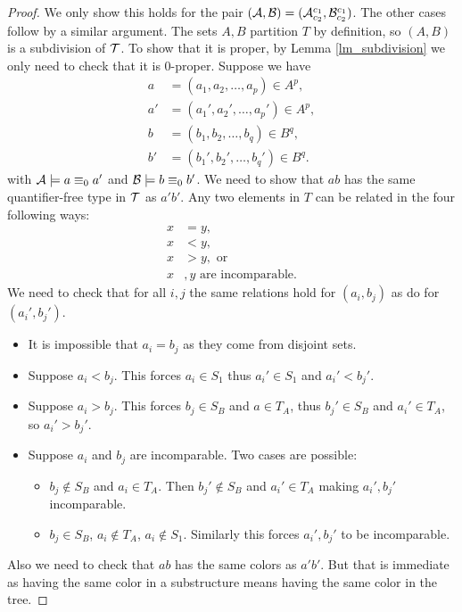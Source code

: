 \begin{proof}
  We only show this holds for the pair $(\mathcal A, \mathcal B) = (\mathcal A^{c_1}_{c_2} ,\mathcal B^{c_1}_{c_2})$.
  The other cases follow by a similar argument.
  The sets $A,B$ partition $T$ by definition, so $(A,B)$ is a subdivision of $\operatorname{\mathcal T}$.
  To show that it is proper, by Lemma \ref{lm_subdivision} we only need to check that it is $0$-proper. Suppose we have
  \begin{align*}
    a &= (a_1, a_2, \ldots, a_p) \in A^p, \\
    a' &= (a_1', a_2', \ldots, a_p') \in A^p,  \\
    b &= (b_1, b_2, \ldots, b_q) \in B^q,  \\
    b' &= (b_1', b_2', \ldots, b_q') \in B^q. 
  \end{align*}
  with $\mathcal A \models a \equiv_0 a'$ and $\mathcal B \models b \equiv_0 b'$.
  We need to show that $ab$ has the same quantifier-free type in $\operatorname{\mathcal T}$ as $a'b'$.
  Any two elements in $T$ can be related in the four following ways:
  \begin{align*}
    x &= y, \\
    x &< y, \\
    x &> y, \text{ or } \\
    x&,y \text{ are incomparable.}
  \end{align*}
  We need to check that  for all $i,j$ the same relations hold for $(a_i, b_j)$ as do for $(a_i', b_j')$.
  
  \begin{itemize}
  \item It is impossible that $a_i = b_j$ as they come from disjoint sets.
  \item Suppose $a_i < b_j$. This forces $a_i \in S_1$ thus $a_i' \in S_1$ and $a_i' < b_j'$.
  \item Suppose $a_i > b_j$. This forces $b_j \in S_B$ and $a \in T_A$, thus $b_j' \in S_B$ and $a_i' \in T_A$, so $a_i' > b_j'$.
  \item Suppose $a_i$ and $b_j$ are incomparable. Two cases are possible:
    \begin{itemize}
    \item $b_j \notin S_B$ and $a_i \in T_A$. Then $b_j' \notin S_B$ and $a_i' \in T_A$ making $a_i', b_j'$ incomparable.
    \item $b_j \in S_B$, $a_i \notin T_A$, $a_i \notin S_1$. Similarly this forces $a_i', b_j'$ to be incomparable.
    \end{itemize}
  \end{itemize}
  Also we need to check that $ab$ has the same colors as $a'b'$. But that is immediate as having the same color in a substructure means having the same color in the tree.
\end{proof}

